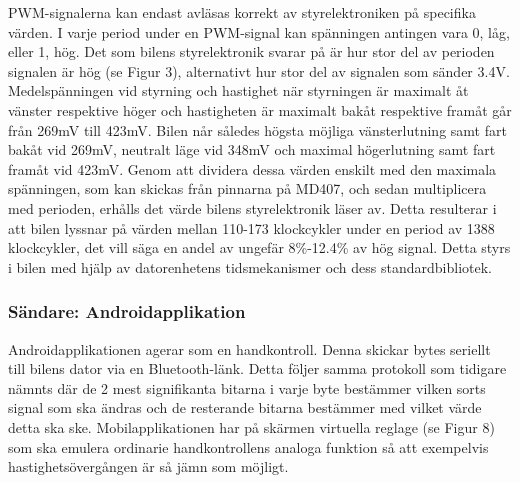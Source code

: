 \documentclass[a4paper]{article}
\begin{document}
\vspace{5mm} \noindent
PWM-signalerna kan endast avläsas korrekt av styrelektroniken på specifika värden. I varje period under en PWM-signal kan spänningen antingen vara 0, låg, eller 1, hög. Det som bilens styrelektronik svarar på är hur stor del av perioden signalen är hög (se Figur 3),  alternativt hur stor del av signalen som sänder 3.4V. Medelspänningen vid styrning och hastighet när styrningen är maximalt åt vänster respektive höger och hastigheten är maximalt bakåt respektive framåt går från 269mV till 423mV. Bilen når således högsta möjliga vänsterlutning samt fart bakåt vid 269mV, neutralt läge vid 348mV och maximal högerlutning samt fart framåt vid 423mV. Genom att dividera dessa värden enskilt med den maximala spänningen, som kan skickas från pinnarna på MD407, och sedan multiplicera med perioden, erhålls det värde bilens styrelektronik läser av. Detta resulterar i att bilen lyssnar på värden mellan 110-173 klockcykler under en period av 1388 klockcykler, det vill säga en andel av ungefär 8\%-12.4\% av hög signal. Detta styrs i bilen med hjälp av datorenhetens tidsmekanismer och dess standardbibliotek.

\subsubsection{Sändare: Androidapplikation}
Androidapplikationen agerar som en handkontroll. Denna skickar bytes seriellt till bilens dator via en Bluetooth-länk. Detta följer samma protokoll som tidigare nämnts där de 2 mest signifikanta bitarna i varje byte bestämmer vilken sorts signal som ska ändras och de resterande bitarna bestämmer med vilket värde detta ska ske. Mobilapplikationen har på skärmen virtuella reglage (se Figur 8) som ska emulera ordinarie handkontrollens analoga funktion så att exempelvis hastighetsövergången är så jämn som möjligt.
\end{document}
